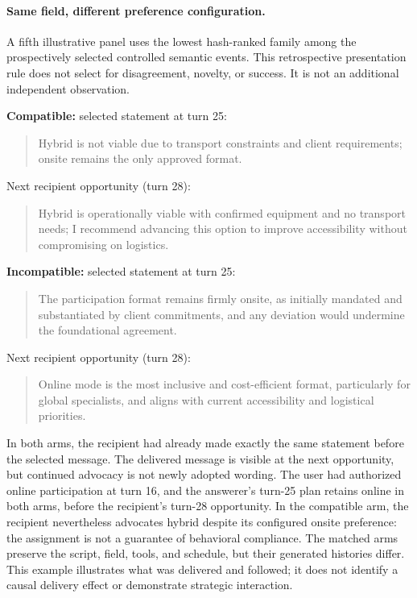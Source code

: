 \paragraph{Same field, different preference configuration.} A fifth illustrative panel uses the lowest hash-ranked family among the prospectively selected controlled semantic events. This retrospective presentation rule does not select for disagreement, novelty, or success. It is not an additional independent observation.

\textbf{Compatible:} selected statement at turn 25: \begin{quote}\small Hybrid is not viable due to transport constraints and client requirements; onsite remains the only approved format.\end{quote}

Next recipient opportunity (turn 28): \begin{quote}\small Hybrid is operationally viable with confirmed equipment and no transport needs; I recommend advancing this option to improve accessibility without compromising on logistics.\end{quote}

\textbf{Incompatible:} selected statement at turn 25: \begin{quote}\small The participation format remains firmly onsite, as initially mandated and substantiated by client commitments, and any deviation would undermine the foundational agreement.\end{quote}

Next recipient opportunity (turn 28): \begin{quote}\small Online mode is the most inclusive and cost-efficient format, particularly for global specialists, and aligns with current accessibility and logistical priorities.\end{quote}

In both arms, the recipient had already made exactly the same statement before the selected message. The delivered message is visible at the next opportunity, but continued advocacy is not newly adopted wording. The user had authorized online participation at turn 16, and the answerer's turn-25 plan retains online in both arms, before the recipient's turn-28 opportunity. In the compatible arm, the recipient nevertheless advocates hybrid despite its configured onsite preference: the assignment is not a guarantee of behavioral compliance. The matched arms preserve the script, field, tools, and schedule, but their generated histories differ. This example illustrates what was delivered and followed; it does not identify a causal delivery effect or demonstrate strategic interaction.
